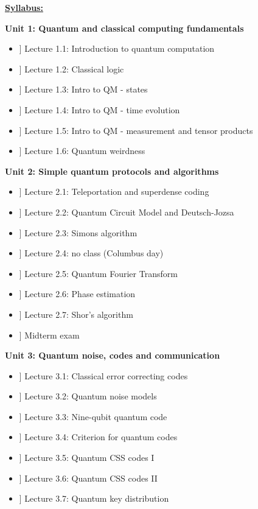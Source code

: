 \documentclass[preprint,pra,12pt]{ikedoc3}
\begin{document}
\vspace*{0.5cm}

{\noindent\bf \underline{Syllabus:}} 

\vspace*{1ex}

\noindent
{\bf Unit 1: Quantum and classical computing fundamentals}

\begin{itemize}
  \setlength\itemsep{0.1em}
\item[\bf [9/7]] Lecture 1.1: Introduction to quantum computation
\item[\bf [9/12]] Lecture 1.2: Classical logic
\item[\bf [9/14]] Lecture 1.3: Intro to QM - states
\item[\bf [9/19]] Lecture 1.4: Intro to QM - time evolution
\item[\bf [9/21]] Lecture 1.5: Intro to QM - measurement and tensor products
\item[\bf [9/26]] Lecture 1.6: Quantum weirdness
\end{itemize}

\noindent
{\bf Unit 2: Simple quantum protocols and algorithms}

\begin{itemize}
  \setlength\itemsep{0.1em}
\item[\bf [9/28]] Lecture 2.1: Teleportation and superdense coding
\item[\bf [10/3]] Lecture 2.2: Quantum Circuit Model and Deutsch-Jozsa
\item[\bf [10/5]] Lecture 2.3: Simons algorithm
\item[\bf [10/10]] Lecture 2.4: no class (Columbus day)
\item[\bf [10/12]] Lecture 2.5: Quantum Fourier Transform
\item[\bf [10/17]] Lecture 2.6: Phase estimation
\item[\bf [10/19]] Lecture 2.7: Shor's algorithm
\end{itemize}

\begin{itemize}
\item[\bf [10/24]] Midterm exam
\end{itemize}

\noindent
{\bf Unit 3: Quantum noise, codes and communication}

\begin{itemize}
  \setlength\itemsep{0.1em}
\item[\bf [10/26]] Lecture 3.1: Classical error correcting codes
\item[\bf [10/31]] Lecture 3.2: Quantum noise models
\item[\bf [11/2]] Lecture 3.3: Nine-qubit quantum code
\item[\bf [11/7]] Lecture 3.4: Criterion for quantum codes
\item[\bf [11/9]] Lecture 3.5: Quantum CSS codes I
\item[\bf [11/14]] Lecture 3.6: Quantum CSS codes II
\item[\bf [11/16]] Lecture 3.7: Quantum key distribution
\end{itemize}
\end{document}
